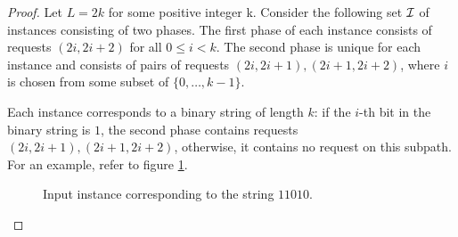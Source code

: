 \begin{proof}
    Let $L = 2k$ for some positive integer k. Consider the following set
    $\mathcal{I}$ of instances consisting of two phases. The first phase of each
    instance consists of requests $(2i, 2i+2)$ for all $0 \leq i < k$.
    The second phase is unique for each instance and consists of pairs of
    requests $(2i, 2i+1), (2i+1, 2i+2)$, where $i$ is chosen from some
    subset of $\{0, \dots, k-1\}$.

    Each instance corresponds to a binary string of length $k$: if the
    $i$-th bit in the binary string is $1$, the second phase contains
    requests $(2i, 2i+1), (2i+1, 2i+2)$, otherwise, it contains no request
    on this subpath. For an example, refer to figure
    \ref{fig:lower-bound-instance}.

    \begin{figure}\centering
        \caption{Input instance corresponding to the string $11010$.}
        \label{fig:lower-bound-instance}
    \end{figure}


\end{proof}
